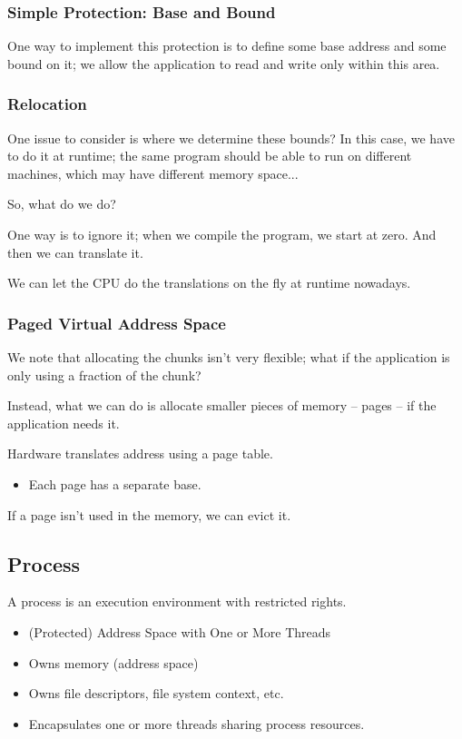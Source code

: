 \documentclass[openany]{book}
\begin{document}
\subsubsection{Simple Protection: Base and Bound}
One way to implement this protection is to define some base address and some bound on it; we allow the application to read and write only within this area.

\subsubsection{Relocation}
One issue to consider is where we determine these bounds? In this case, we have to do it at runtime; the same program should be able to run on different machines, which may have different memory space...

So, what do we do?

One way is to ignore it; when we compile the program, we start at zero. And then we can translate it.

We can let the CPU do the translations on the fly at runtime nowadays.

\subsubsection{Paged Virtual Address Space}
We note that allocating the chunks isn't very flexible; what if the application is only using a fraction of the chunk?

Instead, what we can do is allocate smaller pieces of memory -- pages -- if the application needs it.

Hardware translates address using a page table.
\begin{itemize}
	\item Each page has a separate base. %
\end{itemize}

If a page isn't used in the memory, we can evict it.

\subsection{Process}
\begin{defn}
	A process is an execution environment with restricted rights.
	\begin{itemize}
		\item (Protected) Address Space with One or More Threads
		\item Owns memory (address space)
		\item Owns file descriptors, file system context, etc.
		\item Encapsulates one or more threads sharing process resources.
	\end{itemize}
\end{defn}
\end{document}
